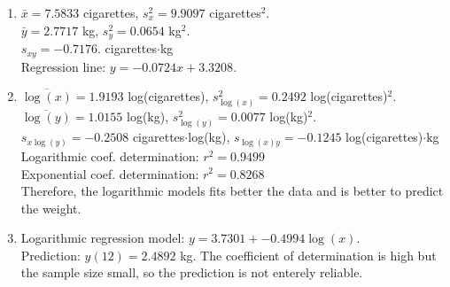{ 
\begin{enumerate}
   \item $\bar x=7.5833$ cigarettes, $s_x^2=9.9097$ cigarettes$^2$.\\ 
   $\bar y=2.7717$ kg, $s_y^2=0.0654$ kg$^2$.\\
     $s_{xy}=-0.7176.$ cigarettes$\cdot$kg\\
     Regression line: $y=-0.0724x + 3.3208$.
   \item $\overline{\log(x)}=1.9193$ log(cigarettes), $s_{\log(x)}^2=0.2492$ log(cigarettes)$^2$.\\
     $\overline{\log(y)}=1.0155$ log(kg), $s_{\log(y)}^2=0.0077$ log(kg)$^2$.\\
     $s_{x\log(y)}=-0.2508$ cigarettes$\cdot$log(kg), $s_{\log(x)y}=-0.1245$ log(cigarettes)$\cdot$kg\\
     Logarithmic coef. determination: $r^2=0.9499$\\
     Exponential coef. determination: $r^2=0.8268$\\
     Therefore, the logarithmic models fits better the data and is better to predict the weight.
   \item Logarithmic regression model: $y=3.7301+-0.4994\log(x)$.\\
     Prediction: $y(12)=2.4892$ kg. The coefficient of determination is high but the sample size small, so the prediction is not enterely reliable.
\end{enumerate}
}
{
}